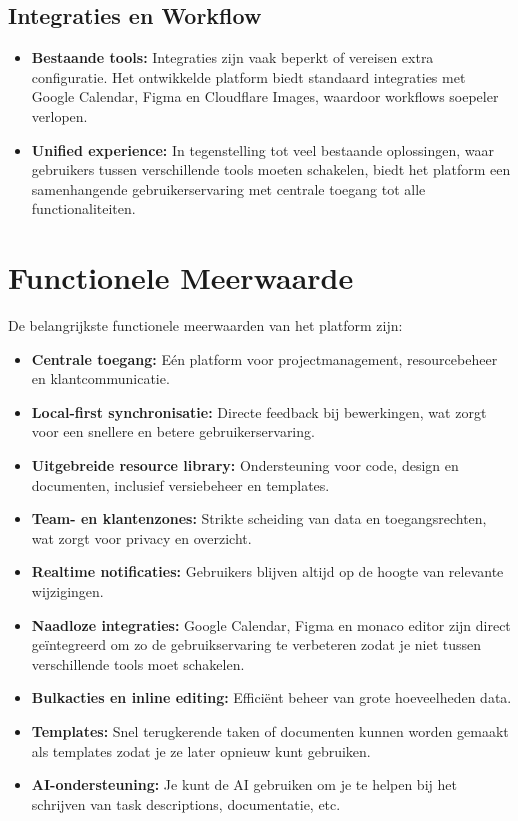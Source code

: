 \subsection{Integraties en Workflow}
\begin{itemize}
    \item \textbf{Bestaande tools:} Integraties zijn vaak beperkt of vereisen extra configuratie. Het ontwikkelde platform biedt standaard integraties met Google Calendar, Figma en Cloudflare Images, waardoor workflows soepeler verlopen.
    \item \textbf{Unified experience:} In tegenstelling tot veel bestaande oplossingen, waar gebruikers tussen verschillende tools moeten schakelen, biedt het platform een samenhangende gebruikerservaring met centrale toegang tot alle functionaliteiten.
\end{itemize}

\section{Functionele Meerwaarde}
\label{sec:meerwaarde}

De belangrijkste functionele meerwaarden van het platform zijn:
\begin{itemize}
    \item \textbf{Centrale toegang:} Eén platform voor projectmanagement, resourcebeheer en klantcommunicatie.
    \item \textbf{Local-first synchronisatie:} Directe feedback bij bewerkingen, wat zorgt voor een snellere en betere gebruikerservaring.
    \item \textbf{Uitgebreide resource library:} Ondersteuning voor code, design en documenten, inclusief versiebeheer en templates.
    \item \textbf{Team- en klantenzones:} Strikte scheiding van data en toegangsrechten, wat zorgt voor privacy en overzicht.
    \item \textbf{Realtime notificaties:} Gebruikers blijven altijd op de hoogte van relevante wijzigingen.
    \item \textbf{Naadloze integraties:} Google Calendar, Figma en monaco editor zijn direct geïntegreerd om zo de gebruikservaring te verbeteren zodat je niet tussen verschillende tools moet schakelen.
    \item \textbf{Bulkacties en inline editing:} Efficiënt beheer van grote hoeveelheden data.
    \item \textbf{Templates:} Snel terugkerende taken of documenten kunnen worden gemaakt als templates zodat je ze later opnieuw kunt gebruiken.
    \item \textbf{AI-ondersteuning:} Je kunt de AI gebruiken om je te helpen bij het schrijven van task descriptions, documentatie, etc.
\end{itemize}

